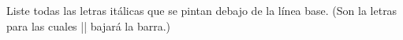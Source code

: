 


\bigskip

\enunciadoS Liste todas las letras it\'alicas que se pintan debajo de
la l\'{i}nea base. (Son la letras para las cuales |\underline|
bajar\'a la barra.)

\bigskip


\bye

